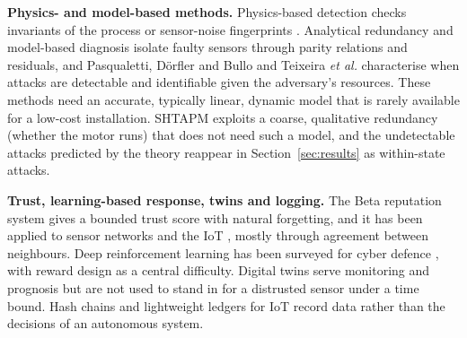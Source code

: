 \documentclass[11pt,a4paper]{article}
\begin{document}
\textbf{Physics- and model-based methods.} Physics-based detection checks invariants of the process \cite{giraldo2018physics} or sensor-noise fingerprints \cite{ahmed2018noise}. Analytical redundancy \cite{chow1984redundancy} and model-based diagnosis \cite{isermann2005fdd} isolate faulty sensors through parity relations and residuals, and Pasqualetti, D\"orfler and Bullo \cite{pasqualetti2013identification} and Teixeira \emph{et al.} \cite{teixeira2015secure} characterise when attacks are detectable and identifiable given the adversary's resources. These methods need an accurate, typically linear, dynamic model that is rarely available for a low-cost installation. SHTAPM exploits a coarse, qualitative redundancy (whether the motor runs) that does not need such a model, and the undetectable attacks predicted by the theory reappear in Section~\ref{sec:results} as within-state attacks.

\textbf{Trust, learning-based response, twins and logging.} The Beta reputation system \cite{josang2002beta} gives a bounded trust score with natural forgetting, and it has been applied to sensor networks and the IoT \cite{ganeriwal2008reputation,bao2012dynamic,bao2012trust,yan2014trust,motmi2022elithe}, mostly through agreement between neighbours. Deep reinforcement learning \cite{mnih2015dqn} has been surveyed for cyber defence \cite{nguyen2023drl}, with reward design as a central difficulty. Digital twins serve monitoring and prognosis \cite{tao2019twin} but are not used to stand in for a distrusted sensor under a time bound. Hash chains \cite{haber1991timestamp} and lightweight ledgers for IoT \cite{dorri2017optimized,nakamoto2008bitcoin} record data rather than the decisions of an autonomous system.
\end{document}
